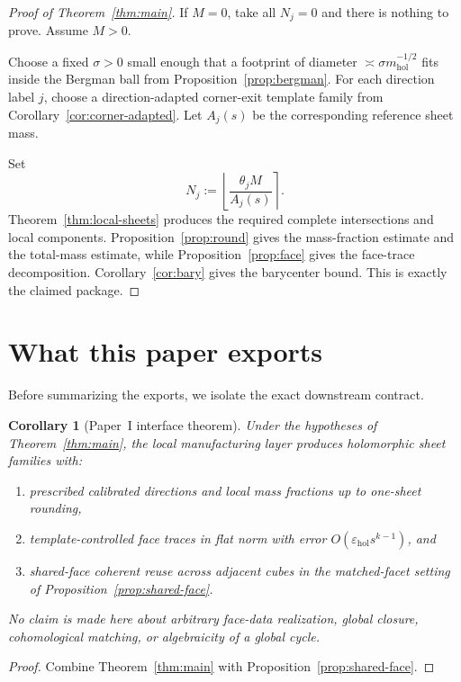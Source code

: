 \documentclass[11pt]{article}
\numberwithin{equation}{section}
\theoremstyle{plain}
\newtheorem{corollary}[theorem]{Corollary}
\theoremstyle{definition}
\theoremstyle{remark}
\newcommand{\eps}{\varepsilon}
\newcommand{\mhol}{m_{\mathrm{hol}}}
\begin{document}
\begin{proof}[Proof of Theorem~\ref{thm:main}]
If $M=0$, take all $N_j=0$ and there is nothing to prove.  Assume $M>0$.

Choose a fixed $\sigma>0$ small enough that a footprint of diameter $\asymp \sigma \mhol^{-1/2}$ fits inside the Bergman ball from Proposition~\ref{prop:bergman}.  For each direction label $j$, choose a direction-adapted corner-exit template family from Corollary~\ref{cor:corner-adapted}.  Let $A_j(s)$ be the corresponding reference sheet mass.

Set
\[
N_j := \left\lfloor \frac{\theta_j M}{A_j(s)} \right\rceil.
\]
Theorem~\ref{thm:local-sheets} produces the required complete intersections and local components.  Proposition~\ref{prop:round} gives the mass-fraction estimate and the total-mass estimate, while Proposition~\ref{prop:face} gives the face-trace decomposition.  Corollary~\ref{cor:bary} gives the barycenter bound.  This is exactly the claimed package.
\end{proof}

\section{What this paper exports}

Before summarizing the exports, we isolate the exact downstream contract.

\begin{corollary}[Paper~I interface theorem]\label{cor:paper1-export}
Under the hypotheses of Theorem~\ref{thm:main}, the local manufacturing layer
produces holomorphic sheet families with:
\begin{enumerate}
\item[\textnormal{(i)}] prescribed calibrated directions and local mass fractions up to one-sheet rounding,
\item[\textnormal{(ii)}] template-controlled face traces in flat norm with error $O(\eps_{\mathrm{hol}}s^{k-1})$, and
\item[\textnormal{(iii)}] shared-face coherent reuse across adjacent cubes in the matched-facet setting of Proposition~\ref{prop:shared-face}.
\end{enumerate}
No claim is made here about arbitrary face-data realization, global closure,
cohomological matching, or algebraicity of a global cycle.
\end{corollary}

\begin{proof}
Combine Theorem~\ref{thm:main} with Proposition~\ref{prop:shared-face}.
\end{proof}
\end{document}
